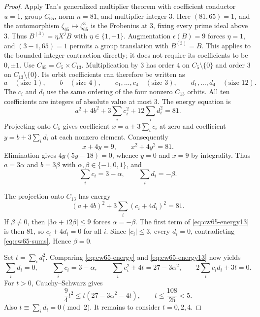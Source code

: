 \documentclass[11pt]{article}
\theoremstyle{remark}
\numberwithin{equation}{section}
\begin{document}
\begin{proof}
Apply Tan's generalized multiplier theorem with coefficient conductor $u=1$,
group $C_{65}$, norm $n=81$, and multiplier integer $3$.
Here $(81,65)=1$, and the automorphism $\zeta_{65}\mapsto\zeta_{65}^3$
is the Frobenius at $3$, fixing every prime ideal above $3$.
Thus $B^{(3)}=\eta X^jB$ with $\eta\in\{1,-1\}$.
Augmentation $\epsilon(B)=9$ forces $\eta=1$, and $(3-1,65)=1$
permits a group translation with $B^{(3)}=B$.
This applies to the bounded integer contraction directly; it does not require
its coefficients to be $0,\pm1$.
Use $C_{65}=C_5\times C_{13}$. Multiplication by $3$ has order $4$ on
$C_5\setminus\{0\}$ and order $3$ on $C_{13}\setminus\{0\}$.
Its orbit coefficients can therefore be written as
\[
 a\quad(\text{size }1),\qquad b\quad(\text{size }4),\qquad
 c_1,\ldots,c_4\quad(\text{size }3),\qquad
 d_1,\ldots,d_4\quad(\text{size }12).
\]
The $c_i$ and $d_i$ use the same ordering of the four nonzero $C_{13}$
orbits. All ten coefficients are integers of absolute value at most $3$.
The energy equation is
\begin{equation}\label{eq:cw65-energy}
 a^2+4b^2+3\sum_i c_i^2+12\sum_i d_i^2=81.
\end{equation}
Projecting onto $C_5$ gives coefficient
$x=a+3\sum_i c_i$ at zero and coefficient
$y=b+3\sum_i d_i$ at each nonzero element. Consequently
\[
 x+4y=9,\qquad x^2+4y^2=81.
\]
Elimination gives $4y(5y-18)=0$, whence $y=0$ and $x=9$ by integrality.
Thus $a=3\alpha$ and $b=3\beta$ with
$\alpha,\beta\in\{-1,0,1\}$, and
\begin{equation}\label{eq:cw65-sums}
 \sum_i c_i=3-\alpha,\qquad \sum_i d_i=-\beta.
\end{equation}

The projection onto $C_{13}$ has energy
\begin{equation}\label{eq:cw65-energy13}
 (a+4b)^2+3\sum_i(c_i+4d_i)^2=81.
\end{equation}
If $\beta\ne0$, then $|3\alpha+12\beta|\le9$ forces
$\alpha=-\beta$. The first term of \eqref{eq:cw65-energy13} is then
$81$, so $c_i+4d_i=0$ for all $i$. Since $|c_i|\le3$, every $d_i=0$,
contradicting \eqref{eq:cw65-sums}. Hence $\beta=0$.

Set $t=\sum_i d_i^2$. Comparing
\eqref{eq:cw65-energy} and \eqref{eq:cw65-energy13} now yields
\begin{equation}\label{eq:cw65-reduced}
 \sum_i d_i=0,\qquad \sum_i c_i=3-\alpha,
 \qquad \sum_i c_i^2+4t=27-3\alpha^2,
 \qquad 2\sum_i c_id_i+3t=0.
\end{equation}
For $t>0$, Cauchy--Schwarz gives
\[
 \frac94t^2\le t(27-3\alpha^2-4t),
 \qquad t\le\frac{108}{25}<5.
\]
Also $t\equiv\sum_i d_i=0\pmod2$. It remains to consider $t=0,2,4$.


\end{proof}
\end{document}
